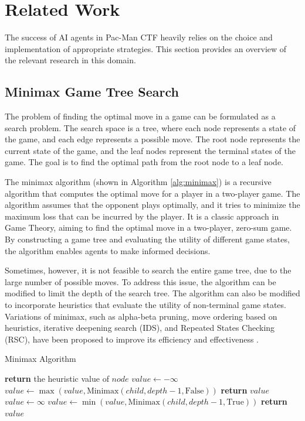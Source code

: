 \documentclass[a4paper,12pt]{article}
\begin{document}
\section{Related Work}
\label{rel_work}

The success of AI agents in Pac-Man CTF heavily relies on the choice and implementation of appropriate strategies. This section provides an overview of the relevant research in this domain.

\subsection{Minimax Game Tree Search}
\label{subsec:minimax}
The problem of finding the optimal move in a game can be formulated as a search problem. The search space is a tree, where each node represents a state of the game, and each edge represents a possible move. The root node represents the current state of the game, and the leaf nodes represent the terminal states of the game. The goal is to find the optimal path from the root node to a leaf node. 

The minimax algorithm \cite{vonNeumann1944} (shown in Algorithm \ref{alg:minimax}) is a recursive algorithm that computes the optimal move for a player in a two-player game. The algorithm assumes that the opponent plays optimally, and it tries to minimize the maximum loss that can be incurred by the player. It is a classic approach in Game Theory, aiming to find the optimal move in a two-player, zero-sum game. By constructing a game tree and evaluating the utility of different game states, the algorithm enables agents to make informed decisions. 

Sometimes, however, it is not feasible to search the entire game tree, due to the large number of possible moves. To address this issue, the algorithm can be modified to limit the depth of the search tree. The algorithm can also be modified to incorporate heuristics that evaluate the utility of non-terminal game states. Variations of minimax, such as alpha-beta pruning, move ordering based on heuristics, iterative deepening search (IDS), and Repeated States Checking (RSC), have been proposed to improve its efficiency and effectiveness \cite{CAMPBELL200257}.

\begin{algorithm}
\caption{Minimax Algorithm}
\label{alg:minimax}
\begin{algorithmic}[1]
\State \textbf{return} the heuristic value of $node$
\EndIf
{}
\State $value \gets -\infty$
\State $value \gets \max(value, \text{Minimax}(child, depth-1, \text{False}))$
\EndFor
\State \textbf{return} $value$
\Else
\State $value \gets \infty$
\State $value \gets \min(value, \text{Minimax}(child, depth-1, \text{True}))$
\EndFor
\State \textbf{return} $value$
\EndIf
\EndProcedure
\end{algorithmic}
\end{algorithm}
\end{document}
